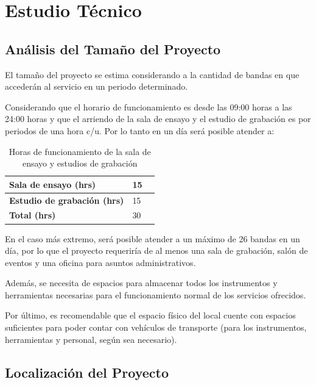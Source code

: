 \section{Estudio Técnico}
 
\subsection{Análisis del Tamaño del Proyecto}

El tamaño del proyecto se estima considerando a la cantidad de bandas en 
que accederán al servicio en un periodo determinado.

Considerando que el horario de funcionamiento es desde las 09:00 horas
a las 24:00 horas y que el arriendo de la sala de ensayo y el estudio
de grabación es por periodos de una hora c/u. Por lo tanto en un día 
será posible atender a:

\begin{table}[h]
    \centering
	\begin{tabular}{|l|l|c|}
		\hline
			\textbf{Sala de ensayo (hrs)}       & 15 \\\hline
			\textbf{Estudio de grabación (hrs)} & 15 \\\hline
			\textbf{Total (hrs)}                & 30 \\\hline
	\end{tabular}
\caption{Horas de funcionamiento de la sala de ensayo y estudios de grabación}
\end{table}
 
En el caso más extremo, será posible atender a un máximo de 26 bandas en un
día, por lo que el proyecto requeriría de al menos una sala de grabación, salón
de eventos y una oficina para asuntos administrativos.

Además, se necesita de espacios para almacenar todos los instrumentos y
herramientas necesarias para el funcionamiento normal de los servicios
ofrecidos.

Por último, es recomendable que el espacio físico del local
cuente con espacios suficientes para poder contar con vehículos de transporte
(para los instrumentos, herramientas y personal, según sea necesario).


\subsection{Localización del Proyecto}

